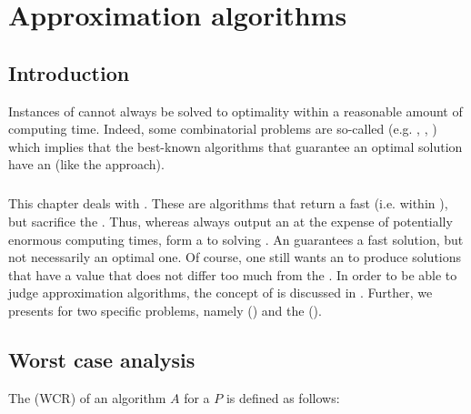 \chapter{Approximation algorithms}

\section{Introduction}
Instances of  cannot always be solved to optimality within a reasonable amount of computing time. Indeed, some combinatorial problems are so-called  (e.g. , , ) which implies that the best-known algorithms that guarantee an optimal solution have an  (like the  approach).

\paragraph{}
This chapter deals with . These are algorithms that return a  fast (i.e. within ), but sacrifice the . Thus, whereas  always output an  at the expense of potentially enormous computing times,  form a  to solving . An  guarantees a fast solution, but not necessarily an optimal one. Of course,
one still wants an  to produce solutions that have a value that does not differ too much from the . In order to be able to judge approximation algorithms, the concept of  is discussed in . Further, we presents  for two specific problems, namely  () and the  ().

\section{Worst case analysis}

The  (WCR) of an algorithm $A$ for a  $P$ is defined as follows:

